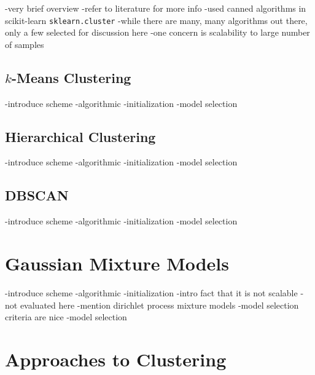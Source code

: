 -very brief overview
-refer to literature for more info
-used canned algorithms in scikit-learn \texttt{sklearn.cluster}
-while there are many, many algorithms out there, only a few selected for discussion here
  -one concern is scalability to large number of samples

\subsection{$k$-Means Clustering}
\label{subsec:chap10-kmeans}

-introduce scheme
-algorithmic
-initialization
-model selection

\subsection{Hierarchical Clustering}
\label{subsec:chap10-agglomerative}

-introduce scheme
-algorithmic
-initialization
-model selection

\subsection{DBSCAN}
\label{subsec:chap10-dbscan}

-introduce scheme
-algorithmic
-initialization
-model selection

\section{Gaussian Mixture Models}
\label{sec:chap10-gmms}

-introduce scheme
-algorithmic
-initialization
-intro fact that it is not scalable - not evaluated here
-mention dirichlet process mixture models
-model selection criteria are nice
-model selection


\section{Approaches to Clustering}
\label{sec:chap10-cluster}

